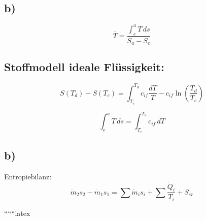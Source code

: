 

\subsection*{b)}
\[
\overline{T} = \frac{\int_{e}^{a} T \, ds}{S_a - S_e}
\]

\subsection*{Stoffmodell ideale Flüssigkeit:}
\[
S(T_d) - S(T_e) = \int_{T_e}^{T_d} c_{if} \frac{dT}{T} - c_{if} \ln \left( \frac{T_d}{T_e} \right)
\]

\[
\int_{e}^{a} T \, ds = \int_{T_e}^{T_a} c_{if} \, dT
\]



\subsection*{b)}
Entropiebilanz:
\[
\dot{m}_2 s_2 - \dot{m}_1 s_1 = \sum \dot{m}_i s_i + \sum \frac{\dot{Q}_i}{T_i} + S_{er}
\]

``````latex